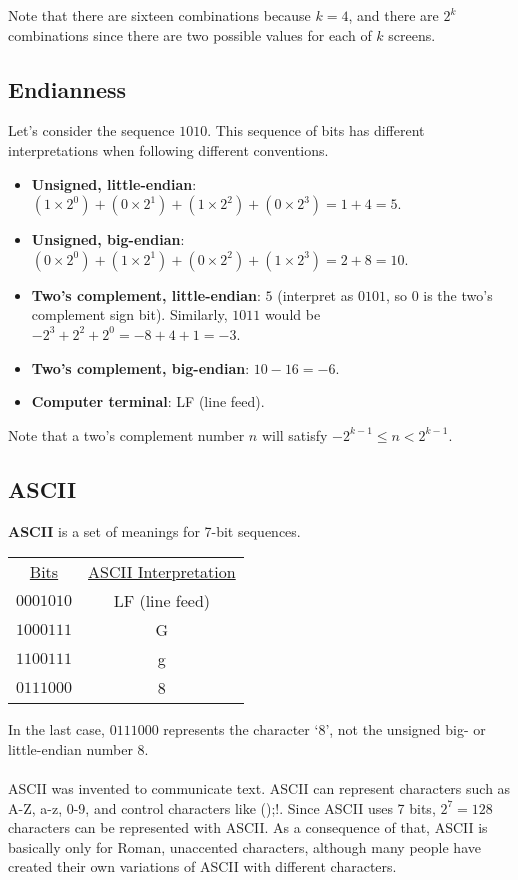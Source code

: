 \documentclass[]{article}
\theoremstyle{definition}
\begin{document}
		Note that there are sixteen combinations because $k = 4$, and there are $2^k$ combinations since there are two possible values for each of $k$ screens.
	
		\subsection{Endianness}
			Let's consider the sequence $1010$. This sequence of bits has different interpretations when following different conventions.
			\begin{itemize}
				\item \textbf{Unsigned, little-endian}: $(1 \times 2^0) + (0 \times 2^1) + (1 \times 2^2) + (0 \times 2^3) = 1 + 4 = 5$.
				\item \textbf{Unsigned, big-endian}: $(0 \times 2^0) + (1 \times 2^1) + (0 \times 2^2) + (1 \times 2^3) = 2 + 8 = 10$.
				\item \textbf{Two's complement, little-endian}: $5$ (interpret as $0101$, so 0 is the two's complement sign bit). Similarly, $1011$ would be $-2^3 + 2^2 + 2^0 = -8 + 4 + 1 = -3$.
				\item \textbf{Two's complement, big-endian}: $10 - 16 = -6$.
				\item \textbf{Computer terminal}: LF (line feed).
			\end{itemize}
	
			Note that a two's complement number $n$ will satisfy $-2^{k-1} \le n < 2^{k-1}$.
	
		\subsection{ASCII}
	
			\textbf{ASCII} is a set of meanings for 7-bit sequences.
		
			\begin{center}
				\begin{tabular}{cc}
					\underline{Bits} & \underline{ASCII Interpretation} \\
					$0001010$ & LF (line feed) \\
					$1000111$ & G \\
					$1100111$ & g \\
					$0111000$ & 8
				\end{tabular}
			\end{center}
			
			In the last case, $0111000$ represents the character `$8$', not the unsigned big- or little-endian number $8$. \\ \\
			ASCII was invented to communicate text. ASCII can represent characters such as A-Z, a-z, 0-9, and control characters like ();!. Since ASCII uses 7 bits, $2^7 = 128$ characters can be represented with ASCII. As a consequence of that, ASCII is basically only for Roman, unaccented characters, although many people have created their own variations of ASCII with different characters.
	
\end{document}
